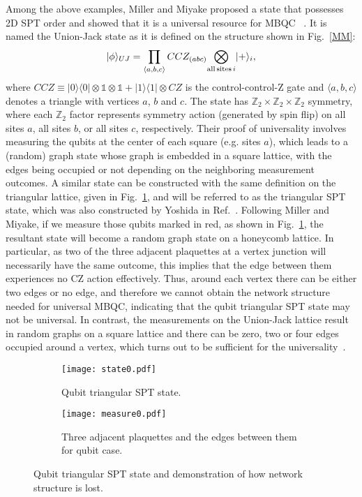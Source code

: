 \documentclass[aps,amsfonts,pra,twocolumn,showpacs]{revtex4-1}
\newcommand{\be}{\begin{equation}}
\newcommand{\ee}{\end{equation}}
\newcommand{\ztwo}{\mathbb{Z}_2}
\begin{document}
Among the above examples, Miller and Miyake proposed a state that possesses 2D SPT order and showed that it is a universal resource for MBQC~ \cite{Miller2016}. It is named the Union-Jack state as it is defined on the structure shown in Fig.~\ref{MM}:
	\be
	|\phi\rangle_{UJ} = \prod_{\langle a, b, c\rangle} CCZ_{(abc)} \underset{{\rm all \, sites} \, i}{\bigotimes} |+\rangle_i, 
	\ee
where $CCZ\equiv|0\rangle\langle 0| \otimes \mathds{1} \otimes \mathds{1} + |1\rangle\langle 1| \otimes CZ$ is the control-control-Z gate and $\langle a, b, c\rangle$ denotes a triangle with vertices $a$, $b$ and $c$. The state has $\ztwo \times \ztwo \times \ztwo$ symmetry, where each $\ztwo$ factor represents symmetry action (generated by spin flip) on all sites $a$, all sites $b$, or all sites $c$, respectively. Their proof of universality involves measuring the qubits at  the center of each square (e.g. sites $a$), which leads to a (random) graph state whose graph is embedded in a square lattice, with the edges being occupied or not depending on the neighboring measurement outcomes. A similar state can be constructed with the same definition on the triangular lattice, given in Fig.~\ref{triangular}, and will be referred to as the triangular SPT state, which was also constructed by Yoshida in Ref.~\cite{Yoshida2016}. Following Miller and Miyake, if we measure those qubits marked in red, as shown in Fig.~\ref{triangular}, the resultant state will become a random graph state on a honeycomb lattice. In particular, as two of the three adjacent plaquettes at a vertex junction will necessarily have the same outcome, this implies that the edge between them experiences  no CZ action effectively. Thus, around each vertex there can be either two edges or no edge, and therefore we cannot obtain the network structure needed for universal MBQC, indicating that the qubit triangular SPT state may not be universal. In contrast, the measurements on the Union-Jack lattice result in random graphs on a square lattice and there can be zero, two or four edges occupied around a vertex, which turns out to be sufficient for the universality~\cite{Miller2016}.


\begin{figure}
	\begin{subfigure}{0.22\textwidth}
		\centering
		\texttt{[image: state0.pdf]}
		\caption{Qubit triangular SPT state. \label{triangular}}
	\end{subfigure}
	\hspace{5mm}
	\begin{subfigure}{0.22\textwidth}
		\centering
		\texttt{[image: measure0.pdf]}
		\caption{Three adjacent plaquettes and the edges between them for qubit case. \label{measure0}}
	\end{subfigure}
	\caption{Qubit triangular SPT state and demonstration of how network structure is lost.}
\end{figure}
\end{document}
